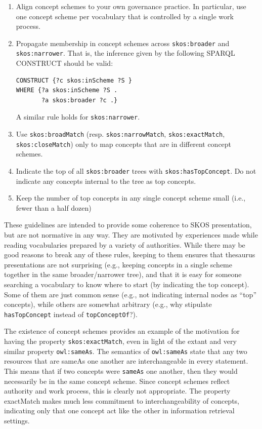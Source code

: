 \begin{enumerate}
\item Align concept schemes to your own governance practice. In particular,
use one concept scheme per vocabulary that is controlled by a single
work process.

\item Propagate membership in concept schemes across \texttt{skos:broader} and
\texttt{skos:narrower}. That
is, the inference given by the following SPARQL CONSTRUCT should be
valid:

\begin{lstlisting}
CONSTRUCT {?c skos:inScheme ?S }
WHERE {?a skos:inScheme ?S .
       ?a skos:broader ?c .}
\end{lstlisting}

A similar rule holds for \texttt{skos:narrower}.

\item Use \texttt{skos:broadMatch} (resp. \texttt{skos:narrowMatch}, \texttt{skos:exactMatch},
\texttt{skos:closeMatch}) only to map concepts that are in different concept
schemes.

\item Indicate the top of all \texttt{skos:broader} trees with \texttt{skos:hasTopConcept}.
Do not indicate any concepts internal to the tree as top concepts.

\item Keep the number of top concepts in any single concept scheme small
(i.e., fewer than a half dozen)

\end{enumerate}

These guidelines are intended to provide some coherence to SKOS
presentation, but are not normative in any way. They are motivated by
experiences made while reading vocabularies prepared by a variety of
authorities. While there may be good reasons to break any of these
rules, keeping to them ensures that thesaurus presentations are not
surprising (e.g., keeping concepts in a single scheme together in the
same broader/narrower tree), and that it is easy for someone searching a
vocabulary to know where to start (by indicating the top concept). Some
of them are just common sense (e.g., not indicating internal nodes as
``top'' concepts), while others are somewhat arbitrary (e.g., why
stipulate \texttt{hasTopConcept} instead of \texttt{topConceptOf}?).

The existence of concept schemes provides an example of the motivation
for having the property
\texttt{skos:exactMatch}, even in light of the extant and very similar property
\texttt{owl:sameAs}. The semantics of \texttt{owl:sameAs} state that any two resources
that are sameAs one another are interchangeable in every statement.
This means that if two concepts were \texttt{sameAs} one another, then they would
necessarily be in the same concept scheme. Since concept schemes reflect
authority and work process, this is clearly not appropriate. The
property exactMatch makes much less commitment to interchangeability of
concepts, indicating only that one concept act like the other in
information retrieval settings.

